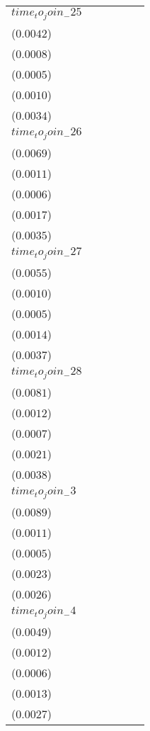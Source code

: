 \begin{tabular}{llllll}
$time_to_join_-25$ &   \makecell{$0.0015^{}$ \\ ($0.0042$)} &  \makecell{$-0.0005^{}$ \\ ($0.0008$)} &  \makecell{$-0.0004^{}$ \\ ($0.0005$)} &   \makecell{$0.0006^{}$ \\ ($0.0010$)} &   \makecell{$0.0048^{}$ \\ ($0.0034$)} \\
$time_to_join_-26$ &   \makecell{$0.0068^{}$ \\ ($0.0069$)} &  \makecell{$-0.0004^{}$ \\ ($0.0011$)} &  \makecell{$-0.0004^{}$ \\ ($0.0006$)} &   \makecell{$0.0019^{}$ \\ ($0.0017$)} &   \makecell{$0.0052^{}$ \\ ($0.0035$)} \\
$time_to_join_-27$ &   \makecell{$0.0008^{}$ \\ ($0.0055$)} &  \makecell{$-0.0003^{}$ \\ ($0.0010$)} &  \makecell{$-0.0003^{}$ \\ ($0.0005$)} &   \makecell{$0.0004^{}$ \\ ($0.0014$)} &   \makecell{$0.0053^{}$ \\ ($0.0037$)} \\
$time_to_join_-28$ &   \makecell{$0.0074^{}$ \\ ($0.0081$)} &  \makecell{$-0.0004^{}$ \\ ($0.0012$)} &  \makecell{$-0.0003^{}$ \\ ($0.0007$)} &   \makecell{$0.0022^{}$ \\ ($0.0021$)} &  \makecell{$0.0064^{*}$ \\ ($0.0038$)} \\
$time_to_join_-3$  &   \makecell{$0.0019^{}$ \\ ($0.0089$)} &  \makecell{$-0.0007^{}$ \\ ($0.0011$)} &  \makecell{$-0.0004^{}$ \\ ($0.0005$)} &   \makecell{$0.0010^{}$ \\ ($0.0023$)} &   \makecell{$0.0022^{}$ \\ ($0.0026$)} \\
$time_to_join_-4$  &  \makecell{$-0.0052^{}$ \\ ($0.0049$)} &  \makecell{$-0.0005^{}$ \\ ($0.0012$)} &  \makecell{$-0.0004^{}$ \\ ($0.0006$)} &  \makecell{$-0.0007^{}$ \\ ($0.0013$)} &   \makecell{$0.0024^{}$ \\ ($0.0027$)} \\

\end{tabular}
